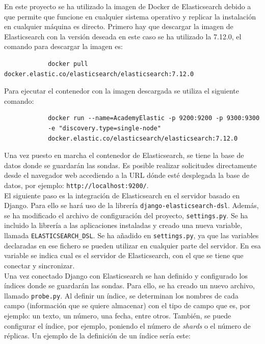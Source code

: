 En este proyecto se ha utilizado la imagen de Docker de Elasticsearch debido a que permite que funcione en cualquier sistema operativo y replicar la instalación en cualquier máquina es directo. Primero hay que descargar la imagen de Elasticsearch con la versión deseada en este caso se ha utilizado la 7.12.0, el comando para descargar la imagen es:
{\footnotesize
		\begin{verbatim}
			docker pull docker.elastic.co/elasticsearch/elasticsearch:7.12.0
		\end{verbatim}
		}
        
Para ejecutar el contenedor con la imagen descargada se utiliza el siguiente comando:

{\footnotesize
		\begin{verbatim}
			docker run --name=AcademyElastic -p 9200:9200 -p 9300:9300
            -e "discovery.type=single-node" 
            docker.elastic.co/elasticsearch/elasticsearch:7.12.0
		\end{verbatim}
		}
\newpage
  Una vez puesto en marcha el contenedor de Elasticsearch, se tiene la base de datos donde se guardarán las sondas. Es posible realizar solicitudes directamente desde el navegador web accediendo a la URL dónde esté desplegada la base de datos, por ejemplo: \texttt{http://localhost:9200/}.\\
  
  El siguiente paso es la integración de Elasticsearch en el servidor basado en Django. Para ello se hará uso de la librería \texttt{django-elasticsearch-dsl}. Además, se ha modificado el archivo de configuración del proyecto, \texttt{settings.py}. Se ha incluido la librería a las aplicaciones instaladas y creado una nueva variable, llamada \texttt{ELASTICSEARCH\_DSL}. Se ha añadido en \texttt{settings.py}, ya que las variables declaradas en ese fichero se pueden utilizar en cualquier parte del servidor. En esa variable se indica cual es el servidor de Elasticsearch, con el que se tiene que conectar y sincronizar.\\
  
Una vez conectado Django con Elasticsearch se han definido y configurado los índices donde se guardarán las sondas. Para ello, se ha creado un nuevo archivo, llamado \texttt{probe.py}. Al definir un índice, se determinan los nombres de cada campo (información que se quiere almacenar) con el tipo de campo que es, por ejemplo: un texto, un número, una fecha, entre otros. También, se puede configurar el índice, por ejemplo, poniendo el número de\textit{ shards }o el número de réplicas. Un ejemplo de la definición de un índice sería este: 

